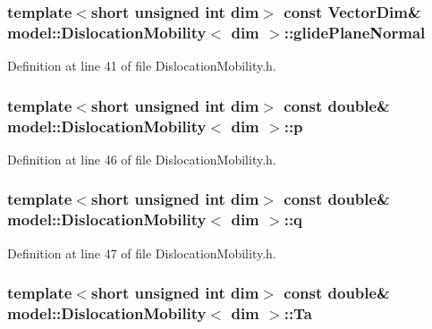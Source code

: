 \subsubsection[{glide\+Plane\+Normal}]{\setlength{\rightskip}{0pt plus 5cm}template$<$short unsigned int dim$>$ const {\bf Vector\+Dim}\& {\bf model\+::\+Dislocation\+Mobility}$<$ {\bf dim} $>$\+::glide\+Plane\+Normal}\label{classmodel_1_1_dislocation_mobility_a171d42953b3a3cbac83c78e96e2bc656}


Definition at line 41 of file Dislocation\+Mobility.\+h.

\hypertarget{classmodel_1_1_dislocation_mobility_a6a2683a113319006c82b60aff0a8b02d}{}
\subsubsection[{p}]{\setlength{\rightskip}{0pt plus 5cm}template$<$short unsigned int dim$>$ const double\& {\bf model\+::\+Dislocation\+Mobility}$<$ {\bf dim} $>$\+::p}\label{classmodel_1_1_dislocation_mobility_a6a2683a113319006c82b60aff0a8b02d}


Definition at line 46 of file Dislocation\+Mobility.\+h.

\hypertarget{classmodel_1_1_dislocation_mobility_a3ad1a43275d2d5b17c5ea5c715681134}{}
\subsubsection[{q}]{\setlength{\rightskip}{0pt plus 5cm}template$<$short unsigned int dim$>$ const double\& {\bf model\+::\+Dislocation\+Mobility}$<$ {\bf dim} $>$\+::q}\label{classmodel_1_1_dislocation_mobility_a3ad1a43275d2d5b17c5ea5c715681134}


Definition at line 47 of file Dislocation\+Mobility.\+h.

\hypertarget{classmodel_1_1_dislocation_mobility_a0de69214bd455c20bb81291765f7d34c}{}
\subsubsection[{Ta}]{\setlength{\rightskip}{0pt plus 5cm}template$<$short unsigned int dim$>$ const double\& {\bf model\+::\+Dislocation\+Mobility}$<$ {\bf dim} $>$\+::Ta}\label{classmodel_1_1_dislocation_mobility_a0de69214bd455c20bb81291765f7d34c}


